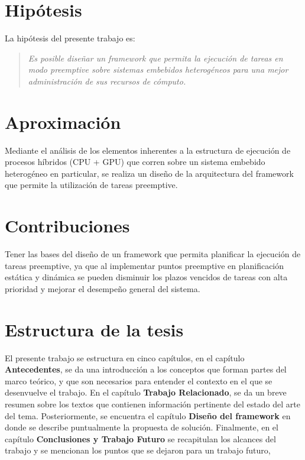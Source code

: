 \section{Hipótesis}
La hipótesis del presente trabajo es:

\begin{quote}
\textit{Es posible diseñar un framework que permita la ejecución de tareas en modo preemptive sobre sistemas embebidos heterogéneos para una mejor administración de sus recursos de cómputo.}
\end{quote}

\section{Aproximación}

Mediante el análisis de los elementos inherentes a la estructura de ejecución de procesos híbridos (CPU + GPU) que corren sobre un sistema embebido heterogéneo en particular, se realiza un diseño de la arquitectura del framework que permite la utilización de tareas preemptive.

\section{Contribuciones}
Tener las bases del diseño de un framework que permita planificar la ejecución de tareas preemptive, ya que al implementar puntos preemptive en planificación estática y dinámica se pueden disminuir los plazos vencidos de tareas con alta prioridad y mejorar el desempeño general del sistema.

\section {Estructura de la tesis}

El presente trabajo se estructura en cinco capítulos, en el capítulo \textbf{Antecedentes}, se da una introducción a los conceptos que forman partes del marco teórico, y que son necesarios para entender el contexto en el que se desenvuelve el trabajo. En el capítulo \textbf{Trabajo Relacionado}, se da un breve resumen sobre los textos que contienen información pertinente del estado del arte del tema. Posteriormente, se encuentra el capítulo \textbf{Diseño del framework} en donde se describe puntualmente la propuesta de solución. Finalmente, en el capítulo \textbf{Conclusiones y Trabajo Futuro} se recapitulan los alcances del trabajo y se mencionan los puntos que se dejaron para un trabajo futuro,

